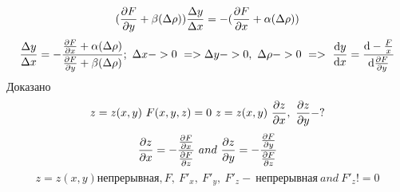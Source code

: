 \documentclass{article}
\begin{document}
\begin{equation*}
    (\pdv{F}{y} + \beta (\Delta \rho))\frac{\Delta y}{\Delta x} = -(\pdv{F}{x} +\alpha(\Delta \rho))
\end{equation*}
\begin{equation*}
    \frac{\Delta y}{\Delta x} = -\frac{\pdv{F}{x} +\alpha(\Delta \rho)}{\pdv{F}{y} + \beta (\Delta \rho)};\ \Delta x -> 0\ => \Delta y->0,\ \Delta \rho -> 0 \ =>\ \dv{y}{x} = \dv{-\frac{F}{x}}{\pdv{F}{y}}
\end{equation*}
Доказано
\begin{equation*}
    z = z(x,y)\ F(x,y,z)= 0\ z=z(x,y)\ \pdv{z}{x},\ \pdv{z}{y} - ?
\end{equation*}
\begin{equation*}
    \pdv{z}{x} = -\frac{\pdv{F}{x}}{\pdv{F}{z}} \ and\ \pdv{z}{y} = -\frac{\pdv{F}{y}}{\pdv{F}{z}}
\end{equation*}
\begin{equation*}
    z = z(x,y) \text{непрерывная}, F,\ F'_x, \ F'_y, \ F'_z - \ \text{непрерывная}\ and\ F'_z != 0
\end{equation*}
\end{document}
